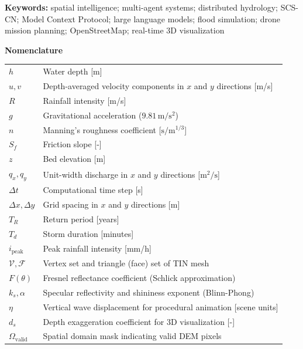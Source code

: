 \documentclass[11pt, a4paper]{article}
\begin{document}
\begin{abstract}
Empirical evaluation demonstrates that a single natural language query --- ``Will Tianshui flood with 150\,mm of rain in 24 hours?'' --- triggers autonomous orchestration of 428 OSM land use polygons, 1{,}174 building assessments, distributed SCS-CN runoff generation (71.7\,mm from 150\,mm rainfall), peak discharge of 59.5\,$\mathrm{m^3/s}$, and 2D inundation reaching 3.12\,m depth over 56.9\% of the analysis area --- all completed in 13--18 seconds on a single consumer GPU (RTX 3070 Ti Laptop, 8\,GB VRAM) with zero API cost beyond LLM inference.
\end{abstract}

\noindent\textbf{Keywords:} spatial intelligence; multi-agent systems; distributed hydrology; SCS-CN; Model Context Protocol; large language models; flood simulation; drone mission planning; OpenStreetMap; real-time 3D visualization

\medskip

\noindent\textbf{Nomenclature}

\small

\begin{tabular}{@{}p{1.4cm}p{13.2cm}@{}}
$h$ & Water depth [m] \\
$u, v$ & Depth-averaged velocity components in $x$ and $y$ directions [m/s] \\
$R$ & Rainfall intensity [m/s] \\
$g$ & Gravitational acceleration ($9.81\,\mathrm{m/s^2}$) \\
$n$ & Manning's roughness coefficient [$\mathrm{s/m^{1/3}}$] \\
$S_f$ & Friction slope [-] \\
$z$ & Bed elevation [m] \\
$q_x, q_y$ & Unit-width discharge in $x$ and $y$ directions [$\mathrm{m^2/s}$] \\
$\Delta t$ & Computational time step [s] \\
$\Delta x, \Delta y$ & Grid spacing in $x$ and $y$ directions [m] \\
$T_R$ & Return period [years] \\
$T_d$ & Storm duration [minutes] \\
$i_{\text{peak}}$ & Peak rainfall intensity [mm/h] \\
$\mathcal{V}, \mathcal{F}$ & Vertex set and triangle (face) set of TIN mesh \\
$F(\theta)$ & Fresnel reflectance coefficient (Schlick approximation) \\
$k_s, \alpha$ & Specular reflectivity and shininess exponent (Blinn-Phong) \\
$\eta$ & Vertical wave displacement for procedural animation [scene units] \\
$d_s$ & Depth exaggeration coefficient for 3D visualization [-] \\
$\Omega_{\text{valid}}$ & Spatial domain mask indicating valid DEM pixels \\
\end{tabular}
\end{document}
